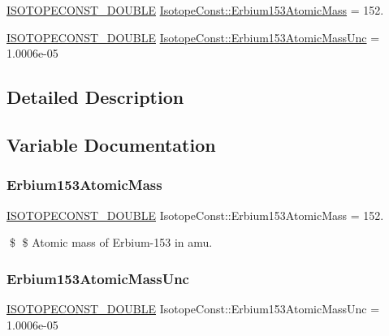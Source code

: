 \begin{DoxyCompactItemize}
\item 
\mbox{\hyperlink{group___isotope_const-_macros_ga8f45a7272ce02c0b4c65c44636ed719a}{I\+S\+O\+T\+O\+P\+E\+C\+O\+N\+S\+T\+\_\+\+D\+O\+U\+B\+LE}} \mbox{\hyperlink{group___isotope_const-_erbium-_er153_gaada64c9e1cf70955af07fe10a17b7d74}{Isotope\+Const\+::\+Erbium153\+Atomic\+Mass}} = 152.
\item 
\mbox{\hyperlink{group___isotope_const-_macros_ga8f45a7272ce02c0b4c65c44636ed719a}{I\+S\+O\+T\+O\+P\+E\+C\+O\+N\+S\+T\+\_\+\+D\+O\+U\+B\+LE}} \mbox{\hyperlink{group___isotope_const-_erbium-_er153_ga1d13d2906054f4a6d1edc26ba63216ba}{Isotope\+Const\+::\+Erbium153\+Atomic\+Mass\+Unc}} = 1.\+0006e-\/05
\end{DoxyCompactItemize}


\subsection{Detailed Description}


\subsection{Variable Documentation}
\mbox{\label{group___isotope_const-_erbium-_er153_gaada64c9e1cf70955af07fe10a17b7d74}} 
\subsubsection{\texorpdfstring{Erbium153\+Atomic\+Mass}{Erbium153AtomicMass}}
{\footnotesize\ttfamily \mbox{\hyperlink{group___isotope_const-_macros_ga8f45a7272ce02c0b4c65c44636ed719a}{I\+S\+O\+T\+O\+P\+E\+C\+O\+N\+S\+T\+\_\+\+D\+O\+U\+B\+LE}} Isotope\+Const\+::\+Erbium153\+Atomic\+Mass = 152.}

\$ \$ Atomic mass of Erbium-\/153 in amu. \mbox{\label{group___isotope_const-_erbium-_er153_ga1d13d2906054f4a6d1edc26ba63216ba}} 
\subsubsection{\texorpdfstring{Erbium153\+Atomic\+Mass\+Unc}{Erbium153AtomicMassUnc}}
{\footnotesize\ttfamily \mbox{\hyperlink{group___isotope_const-_macros_ga8f45a7272ce02c0b4c65c44636ed719a}{I\+S\+O\+T\+O\+P\+E\+C\+O\+N\+S\+T\+\_\+\+D\+O\+U\+B\+LE}} Isotope\+Const\+::\+Erbium153\+Atomic\+Mass\+Unc = 1.\+0006e-\/05}

